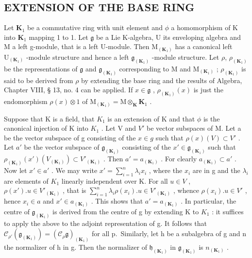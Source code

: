 \subsection{EXTENSION OF THE BASE RING}

Let \(\mathbf{K}_1\) be a commutative ring with unit element and \(\phi\) a homomorphism of K into \(\mathbf{K}_1\) mapping 1 to 1. Let \(\mathfrak{g}\) be a Lie K-algebra, U its enveloping algebra and M a left g-module, that is a left U-module. Then \(\mathrm{M}_{(\mathbf{K}_1)}\) has a canonical left \(\mathrm{U}_{(\mathbf{K}_1)}\) -module structure and hence a left \(\mathfrak{g}_{(\mathbf{K}_1)}\) -module structure. Let \(\rho\), \(\rho_{(\mathbf{K}_1)}\) be the representations of \(\mathfrak{g}\) and \(\mathfrak{g}_{(\mathbf{K}_1)}\) corresponding to M and \(\mathrm{M}_{(\mathbf{K}_1)}\) ; \(\rho_{(\mathbf{K}_1)}\) is said to be derived from \(\rho\) by extending the base ring and the results of Algebra, Chapter VIII, § 13, no. 4 can be applied. If \(x \in \mathfrak{g}\) , \(\rho_{(\mathbf{K}_1)}(x)\) is just the endomorphism \(\rho(x) \otimes 1\) of \(\mathrm{M}_{(\mathbf{K}_1)} = \mathrm{M} \otimes_{\mathbf{K}} \mathbf{K}_1\) .

Suppose that K is a field, that \(K_{1}\) is an extension of K and that \(\phi\) is the canonical injection of K into \(K_{1}\) . Let V and \(V'\) be vector subspaces of M. Let a be the vector subspace of g consisting of the \(x \in g\) such that \(\rho(x)(V) \subset V'\) . Let \(a'\) be the vector subspace of \(\mathfrak{g}_{(\mathbf{K}_{1})}\) consisting of the \(x' \in \mathfrak{g}_{(\mathbf{K}_{1})}\) such that \(\rho_{(\mathbf{K}_{1})}(x')(V_{(\mathbf{K}_{1})}) \subset V'_{(\mathbf{K}_{1})}\) . Then \(a' = a_{(\mathbf{K}_{1})}\) . For clearly \(a_{(\mathbf{K}_{1})} \subset a'\) . Now let \(x' \in a'\) . We may write \(x' = \sum_{i=1}^{n} \lambda_{i} x_{i}\) , where the \(x_{i}\) are in g and the \(\lambda_{i}\) are elements of \(K_{1}\) linearly independent over K. For all \(u \in V\) , \(\rho(x') .u \in V'_{(\mathbf{K}_{1})}\) , that is \(\sum_{i=1}^{n} \lambda_{i} \rho(x_{i}) .u \in V'_{(\mathbf{K}_{1})}\) , whence \(\rho(x_{i}) .u \in V'\) , hence \(x_{i} \in a\) and \(x' \in a_{(\mathbf{K}_{1})}\) . This shows that \(a' = a_{(\mathbf{K}_{1})}\) . In particular, the centre of \(\mathfrak{g}_{(\mathbf{K}_{1})}\) is derived from the centre of g by extending K to \(K_{1}\) : it suffices to apply the above to the adjoint representation of g. It follows that \(\mathcal{C}_{\rho'}(\mathfrak{g}_{(\mathbf{K}_{1})}) = (\mathcal{C}_{\rho}\mathfrak{g})_{(\mathbf{K}_{1})}\) for all p.~Similarly, let h be a subalgebra of g and n the normalizer of h in g. Then the normalizer of \(\mathfrak{h}_{(\mathbf{K}_{1})}\) in \(\mathfrak{g}_{(\mathbf{K}_{1})}\) is \(n_{(\mathbf{K}_{1})}\) .

